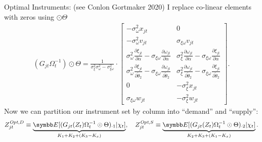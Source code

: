\documentclass[aspectratio=169,10pt]{beamer}
\begin{document}
\begin{frame}{Optimal Instruments: (see Conlon Gortmaker 2020) }
\noindent I replace co-linear elements with zeros using $\odot \Theta$
\begin{align*}
    (G_{jt} \Omega_t^{-1} ) \odot \Theta =  \frac{1}{\sigma_\xi^2 \sigma_\omega^2 - \sigma_{\xi \omega}^2} \cdot 
    \begin{bmatrix}
        -\sigma_\omega^2 x_{jt} & 0  \\
        -\sigma_\omega^2 v_{jt} & \sigma_{\xi \omega} v_{jt} \\
        \sigma_\omega^2 \frac{\partial \xi_{jt}}{\partial \alpha} - 
        \sigma_{\xi\omega}\frac{\partial \omega_{jt}}{\partial \alpha} 
        & \sigma_{\xi}^2 \frac{\partial \omega_{jt}}{\partial \alpha}  - 
        \sigma_{\xi\omega}\frac{\partial \xi_{jt}}{\partial \alpha}  \\
        \sigma_\omega^2 \frac{\partial \xi_{jt}}{\partial \widetilde{\theta}_2}  -
        \sigma_{\xi\omega}\frac{\partial \omega_{jt}}{\partial \widetilde{\theta}_2} 
        & \sigma_{\xi}^2 \frac{\partial \omega_{jt}}{\partial \widetilde{\theta}_2} - 
        \sigma_{\xi\omega}\frac{\partial \xi_{jt}}{\partial \widetilde{\theta}_2}\\
        0 &  -\sigma_{\xi}^2 x_{jt} \\
        \sigma_{\xi\omega} w_{jt} & -\sigma_{\xi}^2 w_{jt}
    \end{bmatrix}
    .
\end{align*}
\noindent Now we can partition our instrument set by column into ``demand'' and ``supply'': 
\begin{align*}
    Z_{jt}^{\textit{Opt},D} \equiv \underbrace{\E[(G_{jt}(Z_t) \Omega_t^{-1} \odot \Theta)_{\cdot 1} | \chi_t]}_{K_1 + K_2 + (K_3 - K_x)}, \quad Z_{jt}^{\textit{Opt},S} \equiv \underbrace{\E[(G_{jt}(Z_t)\Omega_t^{-1} \odot \Theta)_{\cdot 2} | \chi_t]}_{K_2 + K_3+ (K_1 - K_x)}.
\end{align*}
\end{frame}
\end{document}
